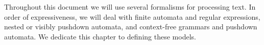 Throughout this document we will use several formalisms for processing text. In order of expressiveness, we will deal with finite automata and regular expressions, nested or visibly pushdown automata, and context-free grammars and pushdown automata. We dedicate this chapter to defining these models. 
